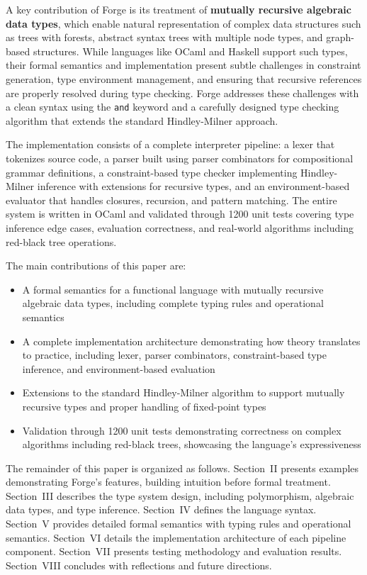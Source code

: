 \documentclass[conference,onecolumn]{IEEEtran}
\begin{document}
A key contribution of Forge is its treatment of \textbf{mutually recursive algebraic data types}, which enable natural representation of complex data structures such as trees with forests, abstract syntax trees with multiple node types, and graph-based structures. While languages like OCaml and Haskell support such types, their formal semantics and implementation present subtle challenges in constraint generation, type environment management, and ensuring that recursive references are properly resolved during type checking. Forge addresses these challenges with a clean syntax using the \texttt{and} keyword and a carefully designed type checking algorithm that extends the standard Hindley-Milner approach.

The implementation consists of a complete interpreter pipeline: a lexer that tokenizes source code, a parser built using parser combinators for compositional grammar definitions, a constraint-based type checker implementing Hindley-Milner inference with extensions for recursive types, and an environment-based evaluator that handles closures, recursion, and pattern matching. The entire system is written in OCaml and validated through 1200 unit tests covering type inference edge cases, evaluation correctness, and real-world algorithms including red-black tree operations.

The main contributions of this paper are:
\begin{itemize}
\item A formal semantics for a functional language with mutually recursive algebraic data types, including complete typing rules and operational semantics
\item A complete implementation architecture demonstrating how theory translates to practice, including lexer, parser combinators, constraint-based type inference, and environment-based evaluation
\item Extensions to the standard Hindley-Milner algorithm to support mutually recursive types and proper handling of fixed-point types
\item Validation through 1200 unit tests demonstrating correctness on complex algorithms including red-black trees, showcasing the language's expressiveness
\end{itemize}

The remainder of this paper is organized as follows. Section~II presents examples demonstrating Forge's features, building intuition before formal treatment. Section~III describes the type system design, including polymorphism, algebraic data types, and type inference. Section~IV defines the language syntax. Section~V provides detailed formal semantics with typing rules and operational semantics. Section~VI details the implementation architecture of each pipeline component. Section~VII presents testing methodology and evaluation results. Section~VIII concludes with reflections and future directions.
\end{document}
